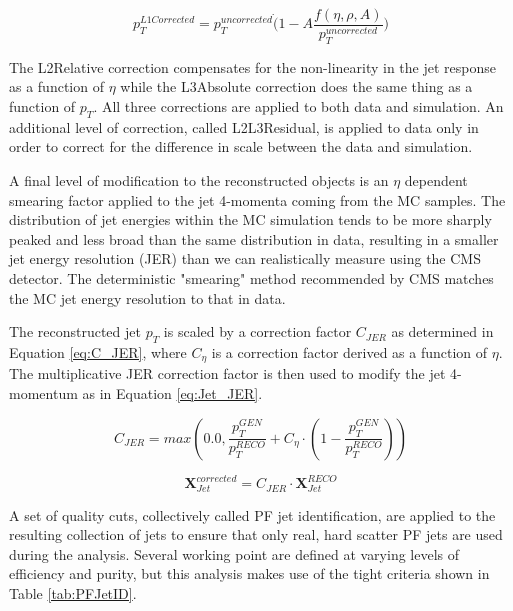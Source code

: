 \begin{equation}
\label{pileupeq}
p_{T}^{L1Corrected} = p_{T}^{uncorrected}\dot(1 - A\frac{f(\eta,\rho,A)}{p_{T}^{uncorrected}})
\end{equation}

The L2Relative correction compensates for the non-linearity in the jet response as a function of $\eta$ while the L3Absolute correction does the same thing as a function of $p_{T}$. All three corrections are applied to both data and simulation. An additional level of correction, called L2L3Residual, is applied to data only in order to correct for the difference in scale between the data and simulation.

A final level of modification to the reconstructed objects is an $\eta$ dependent smearing factor applied to the jet 4-momenta coming from the MC samples. The distribution of jet energies within the MC simulation tends to be more sharply peaked and less broad than the same distribution in data, resulting in a smaller jet energy resolution (JER) than we can realistically measure using the CMS detector. The deterministic "smearing" method recommended by CMS matches the MC jet energy resolution to that in data. 

The reconstructed jet $p_{T}$ is scaled by a correction factor $C_{JER}$ as determined in Equation \ref{eq:C_JER}, where $C_{\eta}$ is a correction factor derived as a function of $\eta$. The multiplicative JER correction factor is then used to modify the jet 4-momentum as in Equation \ref{eq:Jet_JER}.

\begin{equation}
\label{eq:C_JER}
C_{JER}=max\left(0.0,\frac{p_{T}^{GEN}}{p_{T}^{RECO}}+C_{\eta}\cdot\left(1-\frac{p_{T}^{GEN}}{p_{T}^{RECO}}\right)\right)
\end{equation}

\begin{equation}
\label{eq:Jet_JER}
\textbf{X}_{Jet}^{corrected}=C_{JER}{\cdot}\textbf{X}_{Jet}^{RECO}
\end{equation}

A set of quality cuts, collectively called PF jet identification, are applied to the resulting collection of jets to ensure that only real, hard scatter PF jets are used during the analysis\cite{CMS-AN-2010-003}. Several working point are defined at varying levels of efficiency and purity, but this analysis makes use of the tight criteria shown in Table \ref{tab:PFJetID}\cite{PFJetID}.

